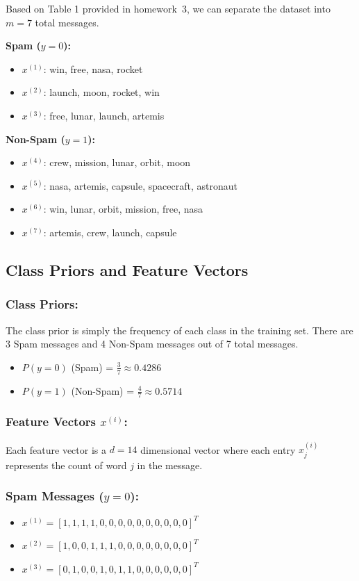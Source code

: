 \documentclass[twoside, 10pt]{article}
\begin{document}
Based on Table 1 provided in homework~3, we can separate the dataset into $m=7$ total messages.

\noindent\textbf{Spam ($y=0$):}
\begin{itemize}
    \item $x^{(1)}$: win, free, nasa, rocket
    \item $x^{(2)}$: launch, moon, rocket, win
    \item $x^{(3)}$: free, lunar, launch, artemis
\end{itemize}
\noindent\textbf{Non-Spam ($y=1$):}
\begin{itemize}
    \item $x^{(4)}$: crew, mission, lunar, orbit, moon
    \item $x^{(5)}$: nasa, artemis, capsule, spacecraft, astronaut
    \item $x^{(6)}$: win, lunar, orbit, mission, free, nasa
    \item $x^{(7)}$: artemis, crew, launch, capsule
\end{itemize}

\subsection{Class Priors and Feature Vectors}
\subsubsection{Class Priors:}
The class prior is simply the frequency of each class in the training set. There are 3 Spam messages and 4 Non-Spam messages out of 7 total messages.
\begin{itemize}
    \item $P(y=0)$ (Spam) = $\frac{3}{7} \approx 0.4286$
    \item $P(y=1)$ (Non-Spam) = $\frac{4}{7} \approx 0.5714$
\end{itemize}
\subsubsection{Feature Vectors $x^{(i)}$:}
Each feature vector is a $d=14$ dimensional vector where each entry $x_j^{(i)}$ represents the count of word $j$ in the message.
\subsubsection*{Spam Messages ($y=0$):}
\begin{itemize}
    \item $x^{(1)} = [1, 1, 1, 1, 0, 0, 0, 0, 0, 0, 0, 0, 0, 0]^T$
    \item $x^{(2)} = [1, 0, 0, 1, 1, 1, 0, 0, 0, 0, 0, 0, 0, 0]^T$
    \item $x^{(3)} = [0, 1, 0, 0, 1, 0, 1, 1, 0, 0, 0, 0, 0, 0]^T$
\end{itemize}
\end{document}
